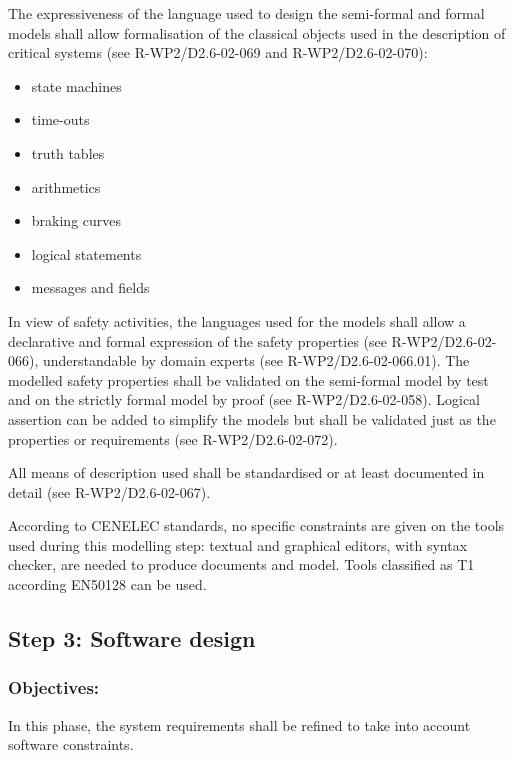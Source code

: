 The expressiveness of the language used to design the semi-formal and formal models shall allow formalisation of the classical objects used in the description of critical systems (see R-WP2/D2.6-02-069 and R-WP2/D2.6-02-070):

\begin{itemize}
\item state machines
\item time-outs
\item truth tables
\item arithmetics
\item braking curves
\item logical statements
\item messages and fields
\end{itemize}


In view of safety activities, the languages used for the models shall allow a declarative and formal expression of the safety properties (see R-WP2/D2.6-02-066), understandable by domain experts (see R-WP2/D2.6-02-066.01). The modelled safety properties shall be validated on the semi-formal model by test and on the strictly formal model by proof (see R-WP2/D2.6-02-058). Logical assertion can be added to simplify the models but shall be validated just as the properties or requirements (see R-WP2/D2.6-02-072).

All means of description used shall be standardised or at least documented in detail (see R-WP2/D2.6-02-067). 

According to  CENELEC standards, no specific constraints are given on the tools used during this modelling step: textual and graphical editors, with syntax checker, are needed to  produce documents and model. Tools classified as T1 according EN50128 can be used.



\subsection{Step  3: Software design}
\label{sec:sw-design}

\subsubsection{Objectives:}
\label{sec:sw-req-objective}


In this phase, the system requirements shall be refined to take into account software constraints.

